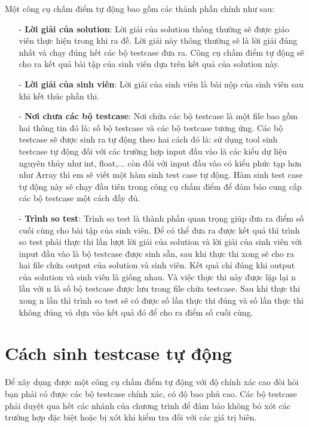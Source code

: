\documentclass[12pt,a4paper]{report}
\begin{document}
Một công cụ chấm điểm tự động bao gồm các thành phần chính như sau:
\begin{itemize}
\item[-] \textbf{Lời giải của solution}: Lời giải của solution thông thường sẽ được giáo viên thực hiện trong khi ra đề. Lời giải này thông thường sẽ là lời giải đúng nhất và chạy đúng hết các bộ testcase đưa ra. Công cụ chấm điểm tự động sẽ cho ra kết quả bài tập của sinh viên dựa trên kết quả của solution này.
\item[-] \textbf{Lời giải của sinh viên}: Lời giải của sinh viên là bài nộp của sinh viên sau khi kết thúc phần thi.
\item[-] \textbf{Nơi chưa các bộ testcase}: Nơi chứa các bộ testcase là một file bao gồm hai thông tin đó là: số bộ testcase và các bộ testcase tương ứng. Các bộ testcase sẽ được sinh ra tự động theo hai cách đó là: sử dụng tool sinh testcase tự động đối với các trường hợp input đầu vào là các kiểu dự liệu nguyên thủy như int, float,... còn đối với input đầu vào có kiểu phức tạp hơn như Array thì em sẽ viết một hàm sinh test case tự động. Hàm sinh test case tự động này sẽ chạy đầu tiên trong công cụ chấm điểm để đảm bảo cung cấp các bộ testcase một cách đầy đủ.
\item[-] \textbf{Trình so test}: Trình so test là thành phần quan trọng giúp đưa ra điểm số cuối cùng cho bài tập của sinh viên. Để có thể đưa ra được kết quả thì trình so test phải thực thi lần lượt lời giải của solution và lời giải của sinh viên với input đầu vào là bộ testcase được sinh sẵn, sau khi thực thi xong sẽ cho ra hai file chứa output của solution và sinh viên. Kết quả chỉ đúng khi output của solution và sinh viên là giống nhau. Và việc thực thi này được lặp lại n lần với n là số bộ testcase được lưu trong file chứa testcase. Sau khi thực thi xong n lần thì trình so test sẽ có được số lần thực thi đúng và số lần thực thi không đúng và dựa vào kết quả đó để cho ra điểm số cuối cùng.
\end{itemize}

\section{Cách sinh testcase tự động}

Để xây dụng được một công cụ chấm điểm tự động với độ chính xác cao đòi hỏi bạn phải có được các bộ testcase chính xác, có độ bao phủ cao. Các bộ testcase phải duyệt qua hết các nhánh của chương trình để đảm bảo không bỏ xót các trường hợp đặc biệt hoặc bị xót khi kiểm tra đối với các giá trị biên.
\end{document}
